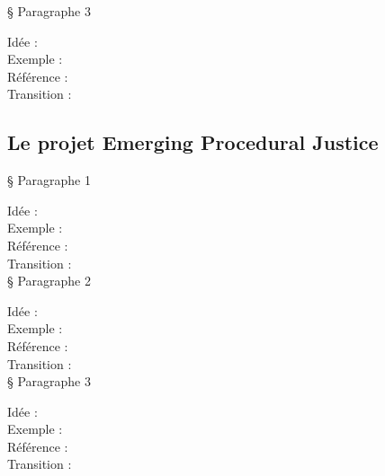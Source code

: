 § Paragraphe 3

Idée :\\
Exemple :\\
Référence :\\
Transition :\\

\subsection{Le projet Emerging Procedural Justice}

§ Paragraphe 1

Idée :\\
Exemple :\\
Référence :\\
Transition :\\

§ Paragraphe 2

Idée :\\
Exemple :\\
Référence :\\
Transition :\\

§ Paragraphe 3

Idée :\\
Exemple :\\
Référence :\\
Transition :\\
